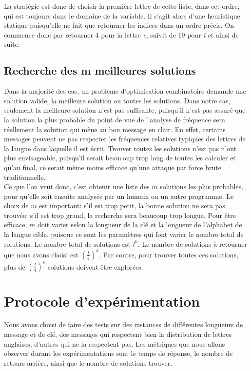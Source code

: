 \documentclass[11pt]{article}
\begin{document}
				La stratégie est donc de choisir la première lettre de cette liste, dans cet ordre, qui est toujours dans le domaine de la variable.
				Il s'agit alors d'une heuristique statique puisqu'elle ne fait que retourner les indices dans un ordre précis.
				On commence donc par retourner 4 pour la lettre \emph{e}, suivit de 19 pour \emph{t} et ainsi de suite.

		\subsection{Recherche des m meilleures solutions}
			Dans la majorité des cas, un problème d'optimisation combinatoire demande une solution valide, la meilleure solution ou toutes les solutions.
			Dans notre cas, seulement la meilleure solution n'est pas suffisante, puisqu'il n'est pas assuré que la solution la plus probable du point de vue de l'analyse de fréquence sera réellement la solution qui mène au bon message en clair.
			En effet, certains messages peuvent ne pas respecter les fréquences relatives typiques des lettres de la langue dans laquelle il est écrit.
			Trouver toutes les solutions n'est pas n'ont plus envisageable, puisqu'il serait beaucoup trop long de toutes les calculer et qu'au final, ce serait même moins efficace qu'une attaque par force brute traditionnelle.\\

			Ce que l'on veut donc, c'est obtenir une liste des $m$ solutions les plus probables, pour qu'elle soit ensuite analysée par un humain ou un autre programme.
			Le choix de $m$ est important: s'il est trop petit, la bonne solution ne sera pas trouvée; s'il est trop grand, la recherche sera beaucoup trop longue.
			Pour être efficace, $m$ doit varier selon la longueur de la clé et la longueur de l'alphabet de la langue cible, puisque ce sont les paramètres qui font varier le nombre total de solutions.
			Le nombre total de solutions est $l^k$. Le nombre de solutions à retourner que nous avons choisi est $(\frac{l}{4})^k$.
			Par contre, pour trouver toutes ces solutions, plus de $(\frac{l}{4})^k$ solutions doivent être explorées.\\


    \section{Protocole d'expérimentation}
		Nous avons choisi de faire des tests  sur des instances de différentes
		longueurs de message et de clé, des messages qui respectent bien la
		distribution de lettres anglaises, d'autres qui ne la respectent pas. Les
		métriques que nous allons observer durant les expérimentations sont le
		temps de réponse, le nombre de retours arrière, ainsi que le nombre de
		solutions trouver. \\
\end{document}
